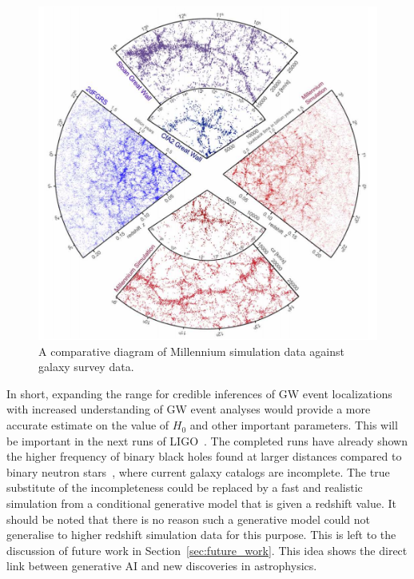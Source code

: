 \documentclass[twocolumn]{article}
\numberwithin{equation}{section}
\begin{document}
\begin{figure}[hbt!]
\includegraphics[width=\columnwidth]{figures/diagrams/mill_catalog_comparison.png}
\centering
\caption[]{A comparative diagram of Millennium simulation data against galaxy survey data\protect\footnotemark.}
\label{fig:gal_catalogs}
\end{figure}

In short, expanding the range for credible inferences of GW event localizations with increased understanding of GW event 
analyses would provide a more accurate estimate on the value of $H_0$ and other important parameters. This will be 
important in the next runs of LIGO~\cite{future_ligo}. The completed runs have already shown the higher frequency of 
binary black holes found at larger distances compared to binary neutron stars~\cite{GW_BNS_BBH_catalog}, where current 
galaxy catalogs are incomplete. The true substitute of the incompleteness could be replaced by a fast and realistic 
simulation from a conditional generative model that is given a redshift value. It should be noted that there is no reason
such a generative model could not generalise to higher redshift simulation data for this purpose. This is left to the 
discussion of future work in Section~\ref{sec:future_work}. This idea shows the direct link between generative AI and 
new discoveries in astrophysics.
\end{document}
